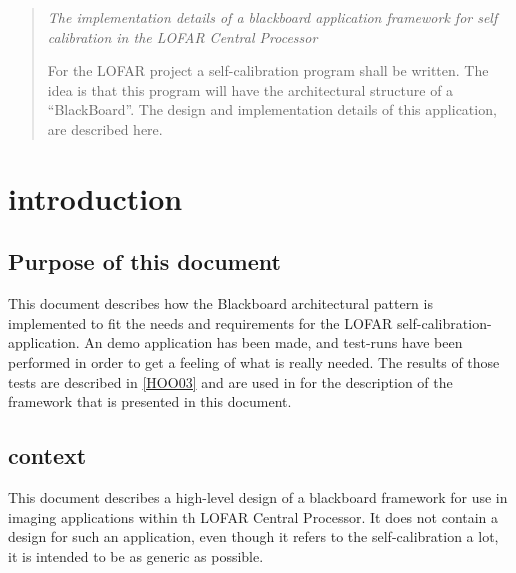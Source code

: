 \documentclass[]{lofar}
\begin{document}
  \maketitle

  \begin{abstract}

    \em{The implementation details of a blackboard application
      framework for self calibration in the LOFAR Central Processor}

    For the LOFAR project a self-calibration program shall be
    written. The idea is that this program will have the architectural
    structure of a ``BlackBoard''. The design and implementation details
    of this application, are described here.
   
  \end{abstract}

  \tableofcontents

  \listoffigures


  \section{introduction}
  \label{sec:introduction}\hypertarget{sec:introduction}{}

    \subsection{Purpose of this document}
    \label{subsec:purpose}\hypertarget{subsec:purpose}{}

      This document describes how the Blackboard architectural pattern
      is implemented to fit the needs and requirements for the LOFAR
      self-calibration-application. An demo application has been made,
      and test-runs have been performed in order to get a feeling of
      what is really needed. The results of those tests are described
      in \hyperlink{bib:LOFAR-ASTRON-MEM-096}{[HOO03]} and are used in
      for the description of the framework that is presented in this
      document.

    \subsection{context}
    \label{subsec:context}\hypertarget{subsec:context}{}

      This document describes a high-level design of a blackboard
      framework for use in imaging applications within th LOFAR Central
      Processor. It does not contain a design for such an application,
      even though it refers to the self-calibration a lot, it is
      intended to be as generic as possible.
\end{document}
